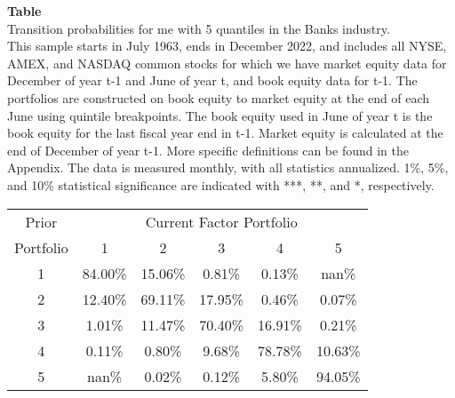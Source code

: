 \begin{table*}[ht!]
\raggedright
{}
\label{tab: transition_probs_me_Banks_with_5_quantiles}
\textbf{Table \thetable} \\
Transition probabilities for me with 5 quantiles in the Banks industry. \\
\hspace*{1em}This sample starts in July 1963, ends in December 2022, and includes all NYSE, AMEX, and NASDAQ common stocks for which we have market equity data for December of year t-1 and June of year t, and book equity data for t-1. The portfolios are constructed on book equity to market equity at the end of each June using quintile breakpoints.  The book equity used in June of year t is the book equity for the last fiscal year end in t-1.  Market equity is calculated at the end of December of year t-1.  More specific definitions can be found in the Appendix.  The data is measured monthly, with all statistics annualized.  1\%, 5\%, and 10\% statistical significance are indicated with ***, **, and *, respectively. \\
\vspace{0.5em}
\centering
\begin{adjustbox}{max width=\textwidth}
\begin{tabular}{@{}cccccc@{}}
\toprule
Prior & \multicolumn{5}{c}{Current Factor Portfolio} \\
Portfolio & 1 & 2 & 3 & 4 & 5 \\
\midrule
1 & 84.00\% & 15.06\% & 0.81\% & 0.13\% & nan\% \\
2 & 12.40\% & 69.11\% & 17.95\% & 0.46\% & 0.07\% \\
3 & 1.01\% & 11.47\% & 70.40\% & 16.91\% & 0.21\% \\
4 & 0.11\% & 0.80\% & 9.68\% & 78.78\% & 10.63\% \\
5 & nan\% & 0.02\% & 0.12\% & 5.80\% & 94.05\% \\
\bottomrule
\end{tabular}
\end{adjustbox}
\end{table*}